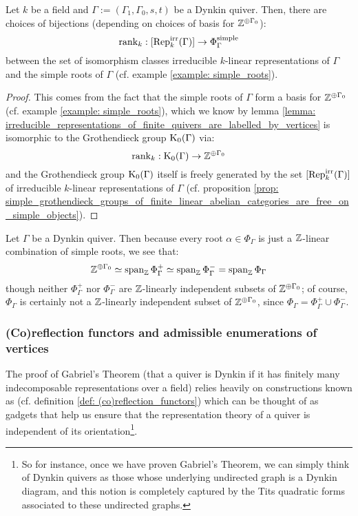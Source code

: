             \begin{proposition} \label{prop: irreducible_representations_of_dynkin_quivers_are_labelled_by_simple_roots}
                Let $k$ be a field and $\Gamma := (\Gamma_1, \Gamma_0, s, t)$ be a Dynkin quiver. Then, there are choices of bijections (depending on choices of basis for $\mathbb{Z}^{\oplus \Gamma_0}$):
                    $$\operatorname{rank}_k: [\mathrm{Rep}_k^{\mathrm{irr}}(\Gamma)] \to \Phi_{\Gamma}^{\mathrm{simple}}$$
                between the set of isomorphism classes irreducible $k$-linear representations of $\Gamma$ and the simple roots of $\Gamma$ (cf. example \ref{example: simple_roots}).
            \end{proposition}
                \begin{proof}
                    This comes from the fact that the simple roots of $\Gamma$ form a basis for $\mathbb{Z}^{\oplus \Gamma_0}$ (cf. example \ref{example: simple_roots}), which we know by lemma \ref{lemma: irreducible_representations_of_finite_quivers_are_labelled_by_vertices} is isomorphic to the Grothendieck group $\mathrm{K}_0(\Gamma)$ via:
                        $$\operatorname{rank}_k: \mathrm{K}_0(\Gamma) \to \mathbb{Z}^{\oplus \Gamma_0}$$
                    and the Grothendieck group $\mathrm{K}_0(\Gamma)$ itself is freely generated by the set $[\mathrm{Rep}_k^{\mathrm{irr}}(\Gamma)]$ of irreducible $k$-linear representations of $\Gamma$ (cf. proposition \ref{prop: simple_grothendieck_groups_of_finite_linear_abelian_categories_are_free_on_simple_objects}).
                \end{proof}
            \begin{remark}
                Let $\Gamma$ be a Dynkin quiver. Then because every root $\alpha \in \Phi_{\Gamma}$ is just a $\mathbb{Z}$-linear combination of simple roots, we see that:
                    $$\mathbb{Z}^{\oplus \Gamma_0} \simeq \operatorname{span}_{\mathbb{Z}} \Phi_{\Gamma}^+ \simeq \operatorname{span}_{\mathbb{Z}} \Phi_{\Gamma}^- = \operatorname{span}_{\mathbb{Z}} \Phi_{\Gamma}$$
                though neither $\Phi_{\Gamma}^+$ nor $\Phi_{\Gamma}^-$ are $\mathbb{Z}$-linearly independent subsets of $\mathbb{Z}^{\oplus \Gamma_0}$; of course, $\Phi_{\Gamma}$ is certainly not a $\mathbb{Z}$-linearly independent subset of $\mathbb{Z}^{\oplus \Gamma_0}$, since $\Phi_{\Gamma} = \Phi_{\Gamma}^+ \cup \Phi_{\Gamma}^-$.
            \end{remark}
            
        \subsubsection{(Co)reflection functors and admissible enumerations of vertices}
            The proof of Gabriel's Theorem (that a quiver is Dynkin if it has finitely many indecomposable representations over a field) relies heavily on constructions known as  (cf. definition \ref{def: (co)reflection_functors}) which can be thought of as gadgets that help us ensure that the representation theory of a quiver is independent of its orientation\footnote{So for instance, once we have proven Gabriel's Theorem, we can simply think of Dynkin quivers as those whose underlying undirected graph is a Dynkin diagram, and this notion is completely captured by the Tits quadratic forms associated to these undirected graphs.}. 
            
